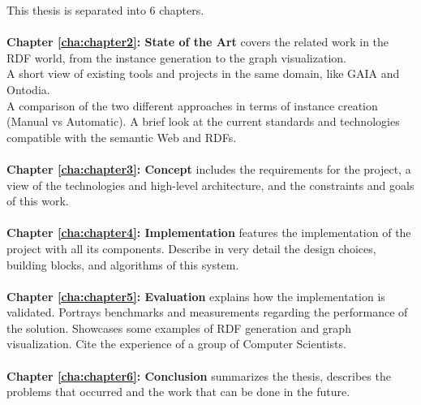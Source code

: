 This thesis is separated into 6 chapters.
\\
\\
\textbf{Chapter \ref{cha:chapter2}: State of the Art} covers the related work in the RDF world, from the instance generation to the graph visualization. 
\\
A short view of existing tools and projects in the same domain, like GAIA and Ontodia.
\\
A comparison of the two different approaches in terms of instance creation (Manual vs Automatic).
A brief look at the current standards and technologies compatible with the semantic Web and RDFs.
\\
\\
\textbf{Chapter \ref{cha:chapter3}: Concept} includes the requirements for the project, a view of the technologies and high-level architecture, and the constraints and goals of this work.
\\
\\
\textbf{Chapter \ref{cha:chapter4}: Implementation} features the implementation of the project with all its components. Describe in very detail the design choices, building blocks, and algorithms of this system.
\\
\\
\textbf{Chapter \ref{cha:chapter5}: Evaluation} explains how the implementation is validated. Portrays benchmarks and measurements regarding the performance of the solution. Showcases some examples of RDF generation and graph visualization. Cite the experience of a group of Computer Scientists. 
\\
\\
\textbf{Chapter \ref{cha:chapter6}: Conclusion} summarizes the thesis, describes the problems that occurred and the work that can be done in the future. 